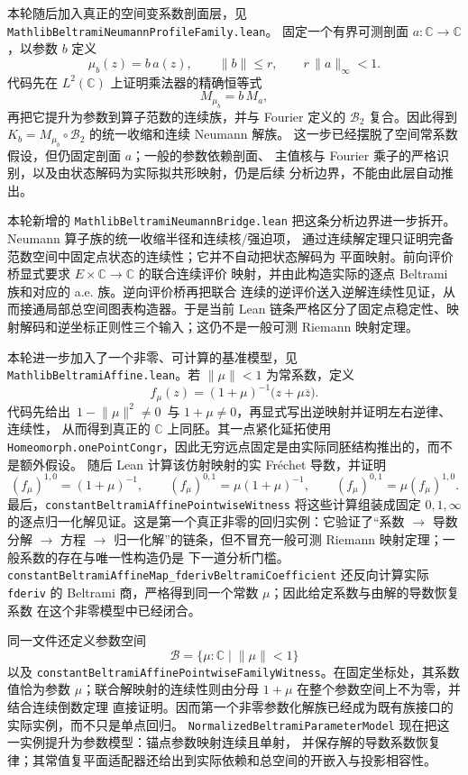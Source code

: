 \documentclass[UTF8,fontset=none,a4paper,11pt]{ctexart}
\begin{document}
本轮随后加入真正的空间变系数剖面层，见
\texttt{MathlibBeltramiNeumann}\allowbreak\texttt{ProfileFamily}\allowbreak\texttt{.lean}。
固定一个有界可测剖面 \(a:\mathbb C\to\mathbb C\)，以参数 \(b\) 定义
\[
 \mu_b(z)=b\,a(z),\qquad \lVert b\rVert\le r,
 \qquad r\,\lVert a\rVert_\infty<1.
\]
代码先在 \(L^2(\mathbb C)\) 上证明乘法器的精确恒等式
\[
 M_{\mu_b}=b\,M_a,
\]
再把它提升为参数到算子范数的连续族，并与 Fourier 定义的
\(\mathcal B_2\) 复合。因此得到
\(K_b=M_{\mu_b}\circ\mathcal B_2\) 的统一收缩和连续 Neumann 解族。
这一步已经摆脱了空间常系数假设，但仍固定剖面 \(a\)；一般的参数依赖剖面、
主值核与 Fourier 乘子的严格识别，以及由状态解码为实际拟共形映射，仍是后续
分析边界，不能由此层自动推出。\par

本轮新增的
\texttt{MathlibBeltramiNeumann}\allowbreak\texttt{Bridge.lean}
把这条分析边界进一步拆开。Neumann 算子族的统一收缩半径和连续核/强迫项，
通过连续解定理只证明完备范数空间中固定点状态的连续性；它并不自动把状态解码为
平面映射。前向评价桥显式要求 \(E\times\mathbb C\to\mathbb C\) 的联合连续评价
映射，并由此构造实际的逐点 Beltrami 族和对应的 a.e. 族。逆向评价桥再把联合
连续的逆评价送入逆解连续性见证，从而接通局部总空间图表构造器。于是当前 Lean
链条严格区分了固定点稳定性、映射解码和逆坐标正则性三个输入；这仍不是一般可测
Riemann 映射定理。\par

本轮进一步加入了一个非零、可计算的基准模型，见
\texttt{MathlibBeltramiAffine}\allowbreak\texttt{.lean}。若 $\lVert\mu\rVert<1$ 为常系数，定义
\[
 f_\mu(z)=(1+\mu)^{-1}\bigl(z+\mu\overline z\bigr).
\]
代码先给出
\(\,1-\lVert\mu\rVert^2\ne0\,\) 与 \(1+\mu\ne0\)，再显式写出逆映射并证明左右逆律、连续性，
从而得到真正的 \(\mathbb C\) 上同胚。其一点紧化延拓使用
\texttt{Homeomorph.onePointCongr}，因此无穷远点固定是由实际同胚结构推出的，而不是额外假设。
随后 Lean 计算该仿射映射的实 Fréchet 导数，并证明
\[
 (f_\mu)^{1,0}=(1+\mu)^{-1},\qquad
 (f_\mu)^{0,1}=\mu(1+\mu)^{-1},\qquad
 (f_\mu)^{0,1}=\mu(f_\mu)^{1,0}.
\]
最后，\texttt{constantBeltramiAffinePointwiseWitness} 将这些计算组装成固定 $0,1,\infty$
的逐点归一化解见证。这是第一个真正非零的回归实例：它验证了“系数 $\to$ 导数分解 $\to$
方程 $\to$ 归一化解”的链条，但不冒充一般可测 Riemann 映射定理；一般系数的存在与唯一性构造仍是
下一道分析门槛。
\texttt{constantBeltramiAffineMap\_fderivBeltramiCoefficient} 还反向计算实际
\texttt{fderiv} 的 Beltrami 商，严格得到同一个常数 $\mu$；因此给定系数与由解的导数恢复系数
在这个非零模型中已经闭合。

同一文件还定义参数空间
\[
 \mathcal B=\{\mu:\mathbb C\mid \lVert\mu\rVert<1\}
\]
以及 \texttt{constantBeltramiAffinePointwiseFamilyWitness}。在固定坐标处，其系数值恰为参数
\(\mu\)；联合解映射的连续性则由分母 \(1+\mu\) 在整个参数空间上不为零，并结合连续倒数定理
直接证明。因而第一个非零参数化解族已经成为既有族接口的实际实例，而不只是单点回归。
\texttt{NormalizedBeltramiParameterModel} 现在把这一实例提升为参数模型：锚点参数映射连续且单射，
并保存解的导数系数恢复律；其常值复平面适配器还给出到实际依赖和总空间的开嵌入与投影相容性。
\end{document}
